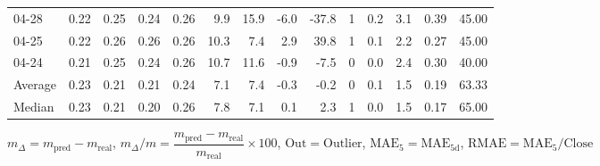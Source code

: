 \begin{threeparttable}
{\begin{tabular}{lrrrrrrrrrrrrr}
  04-28 &          0.22 &          0.25 &          0.24 &        0.26 &                 9.9 &                15.9 &       -6.0 &        -37.8 &              1 &                 0.2 &              3.1 &            0.39 &                  45.00 \\
  04-25 &          0.22 &          0.26 &          0.26 &        0.26 &                10.3 &                 7.4 &        2.9 &         39.8 &              1 &                 0.1 &              2.2 &            0.27 &                  45.00 \\
  04-24 &          0.21 &          0.25 &          0.24 &        0.26 &                10.7 &                11.6 &       -0.9 &         -7.5 &              0 &                 0.0 &              2.4 &            0.30 &                  40.00 \\
Average &          0.23 &          0.21 &          0.21 &        0.24 &                 7.1 &                 7.4 &       -0.3 &         -0.2 &              0 &                 0.1 &              1.5 &            0.19 &                  63.33 \\
 Median &          0.23 &          0.21 &          0.20 &        0.26 &                 7.8 &                 7.1 &        0.1 &          2.3 &              1 &                 0.0 &              1.5 &            0.17 &                  65.00 \\
\bottomrule
\end{tabular}
}
\begin{tablenotes}\footnotesize
\item $m_\Delta=m_{\text{pred}}-m_{\text{real}}$,
$m_\Delta/m=\dfrac{m_{\text{pred}}-m_{\text{real}}}{m_{\text{real}}}\times100$,
$\mathrm{Out}=\text{Outlier}$,
$\mathrm{MAE}_5=\mathrm{MAE}_{5\text{d}}$,
$\mathrm{RMAE}=\mathrm{MAE}_5/\text{Close}$
\end{tablenotes}
\end{threeparttable}
\endgroup

